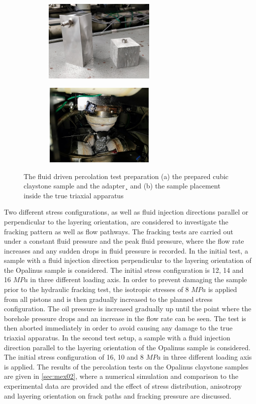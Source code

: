 \begin{figure}[!ht]
\begin{subfigure}[c]{0.48\textwidth}
\includegraphics[width=6cm,height=4cm]{figures/Amir_Percolation_Adapter.png}
\subcaption{}
\label{fig:Amir_Percolation_Adapter}
\end{subfigure}
\hfill
\begin{subfigure}[c]{0.48\textwidth}
\includegraphics[width=6cm,height=4cm]{figures/Amir_Percolation_Setup.png}
\subcaption{}
\label{fig:Amir_Percolation_Setup}
\end{subfigure}
\caption{The fluid driven percolation test preparation (a) the prepared cubic claystone sample and the adapter¸ and (b) the sample placement inside the true triaxial apparatus}
\end{figure}

Two different stress configurations, as well as fluid injection directions parallel or perpendicular to the layering orientation, are considered to investigate the fracking pattern as well as flow pathways. The fracking tests are carried out under a constant fluid pressure and the peak fluid pressure, where the flow rate increases and any sudden drops in fluid pressure is recorded. In the initial test, a sample with a fluid injection direction perpendicular to the layering orientation of the Opalinus sample is considered. The initial stress configuration is 12, 14 and 16 $MPa$ in three different loading axis. In order to prevent damaging the sample prior to the hydraulic fracking test, the isotropic stresses of 8 $MPa$ is applied from all pistons and is then gradually increased to the planned stress configuration. The oil pressure is increased gradually up until the point where the borehole pressure drops and an increase in the flow rate can be seen. The test is then aborted immediately in order to avoid causing any damage to the true triaxial apparatus. In the second test setup, a sample with a fluid injection direction parallel to the layering orientation of the Opalinus sample is considered. The initial stress configuration of 16, 10 and 8 $MPa$ in three different loading axis is applied. The results of the percolation tests on the Opalinus claystone samples are given in \ref{sec:mex02}, where a numerical simulation and comparison to the experimental data are provided and the effect of stress distribution, anisotropy and layering orientation on frack paths and fracking pressure are discussed. 
